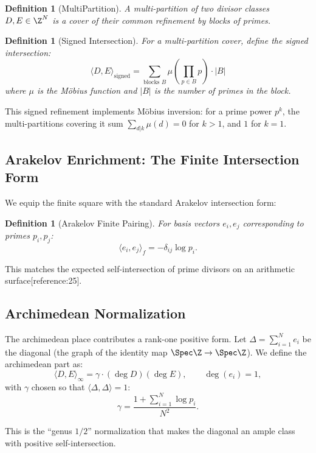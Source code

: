 \documentclass[11pt,a4paper]{article}
\newtheorem{definition}[theorem]{Definition}
\begin{document}
\begin{definition}[MultiPartition]
A multi-partition of two divisor classes $D, E \in \Z^N$ is a cover of their common refinement by blocks of primes.
\end{definition}

\begin{definition}[Signed Intersection]
For a multi-partition cover, define the signed intersection:
\[
\langle D, E \rangle_{\text{signed}} = \sum_{\text{blocks } B} \mu\!\left(\prod_{p \in B} p\right) \cdot |B|
\]
where $\mu$ is the Möbius function and $|B|$ is the number of primes in the block.
\end{definition}

This signed refinement implements Möbius inversion: for a prime power $p^k$, the multi-partitions covering it sum $\sum_{d|k} \mu(d) = 0$ for $k>1$, and $1$ for $k=1$.

\subsection{Arakelov Enrichment: The Finite Intersection Form}

We equip the finite square with the standard Arakelov intersection form:

\begin{definition}[Arakelov Finite Pairing]
For basis vectors $e_i, e_j$ corresponding to primes $p_i, p_j$:
\[
\langle e_i, e_j \rangle_f = -\delta_{ij} \log p_i .
\]
\end{definition}

This matches the expected self-intersection of prime divisors on an arithmetic surface[reference:25].

\subsection{Archimedean Normalization}

The archimedean place contributes a rank-one positive form. Let $\Delta = \sum_{i=1}^N e_i$ be the diagonal (the graph of the identity map $\Spec \Z \to \Spec \Z$). We define the archimedean part as:
\[
\langle D, E \rangle_\infty = \gamma \cdot (\deg D)(\deg E), \qquad \deg(e_i) = 1,
\]
with $\gamma$ chosen so that $\langle \Delta, \Delta \rangle = 1$:
\[
\gamma = \frac{1 + \sum_{i=1}^N \log p_i}{N^2}.
\]

This is the ``genus $1/2$'' normalization that makes the diagonal an ample class with positive self-intersection.
\end{document}
